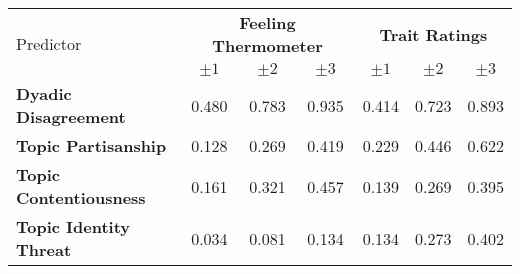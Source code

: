 \begin{tabular}{lccc ccc}
\hline
\multirow{2}{*}{Predictor} & \multicolumn{3}{c}{\textbf{Feeling Thermometer}} & \multicolumn{3}{c}{\textbf{Trait Ratings}} \\
 & $\pm1$ & $\pm2$ & $\pm3$ & $\pm1$ & $\pm2$ & $\pm3$ \\
\hline
\textbf{Dyadic Disagreement} & 0.480 & 0.783 & 0.935 & 0.414 & 0.723 & 0.893 \\
\textbf{Topic Partisanship} & 0.128 & 0.269 & 0.419 & 0.229 & 0.446 & 0.622 \\
\textbf{Topic Contentiousness} & 0.161 & 0.321 & 0.457 & 0.139 & 0.269 & 0.395 \\
\textbf{Topic Identity Threat} & 0.034 & 0.081 & 0.134 & 0.134 & 0.273 & 0.402 \\
\hline
\end{tabular}